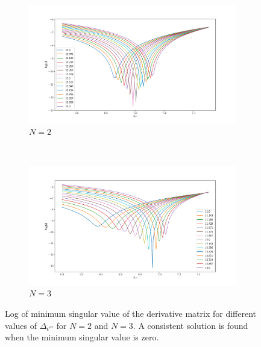 \documentclass[a4paper,11pt]{article}
\begin{document}
\begin{figure}

\begin{subfigure}{\columnwidth}
    \centering
    \includegraphics[scale=0.45]{Normal_N2.pdf}
    \caption{$N = 2$}
\end{subfigure}
~

\begin{subfigure}{\columnwidth}
    \centering
    \includegraphics[scale=0.45]{Normal_N3_new.pdf}
    \caption{$N = 3$}
\end{subfigure}


\caption{Log of minimum singular value of the derivative matrix for different values of $\Delta_{\epsilon'''}$ for $N = 2$ and $N = 3$. A consistent solution is found when the minimum singular value is zero.}
\label{fig:res}
\end{figure}
\end{document}
